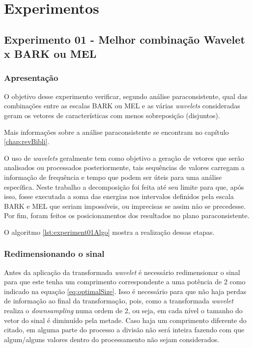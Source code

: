 	\section{Experimentos}
		\subsection{Experimento 01 - Melhor combinação Wavelet x BARK ou MEL}
		\label{chap:propApproach:sec:Experimento01}
			\subsubsection{Apresentação}
				\par O objetivo desse experimento verificar, segundo análise paraconsistente, qual das combinações entre as escalas BARK ou MEL e as várias \textit{wavelets} consideradas geram os vetores de características com menos sobreposição (disjuntos).
				
				\par Mais informações sobre a análise paraconsistente se encontram no capítulo \ref{chap:revBibli}. 
				
				\par O uso de \textit{wavelets} geralmente tem como objetivo a geração de vetores que serão analisados ou processados posteriormente, tais sequências de valores carregam a informação de frequência e tempo que podem ser úteis para uma análise específica. Neste trabalho a decomposição foi feita até seu limite  para que, após isso, fosse executada a soma das energias nos intervalos definidos pela escala BARK e MEL que seriam impossíveis, ou imprecisas se assim não se precedesse. Por fim, foram  feitos os posicionamentos dos resultados no plano paraconsistente.
				
				\par O algoritmo \ref{lst:experiment01Algo} mostra a realização dessas etapas.
			
			\subsubsection{Redimensionando o sinal}
				\par Antes da aplicação da transformada \textit{wavelet} é necessário redimensionar o sinal para que este tenha um comprimento correspondente a uma potência de 2 como indicado na equação \ref{eq:optimalSize}. Isso é necessário para que não haja perdas de informação ao final da transformação, pois, como a transformada \textit{wavelet} realiza o \textit{downsampling} numa ordem de 2, ou seja, em cada nível o tamanho do vetor do sinal é diminuído pela metade. Caso haja um comprimento diferente do citado, em alguma parte do processo a divisão não será inteira fazendo com que algum/alguns valores dentro do processamento não sejam considerados.
				
